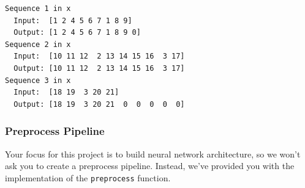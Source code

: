 \documentclass[11pt]{article}
\begin{document}
    \begin{Verbatim}[commandchars=\\\{\}]
Sequence 1 in x
  Input:  [1 2 4 5 6 7 1 8 9]
  Output: [1 2 4 5 6 7 1 8 9 0]
Sequence 2 in x
  Input:  [10 11 12  2 13 14 15 16  3 17]
  Output: [10 11 12  2 13 14 15 16  3 17]
Sequence 3 in x
  Input:  [18 19  3 20 21]
  Output: [18 19  3 20 21  0  0  0  0  0]

    \end{Verbatim}

    \subsubsection{Preprocess Pipeline}\label{preprocess-pipeline}

Your focus for this project is to build neural network architecture, so
we won't ask you to create a preprocess pipeline. Instead, we've
provided you with the implementation of the \texttt{preprocess}
function.
\end{document}
